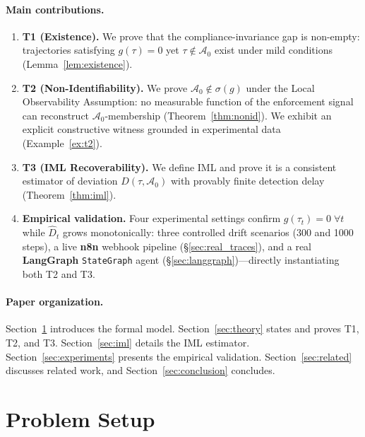 \documentclass[11pt]{article}
\newcommand{\Azero}{\mathcal{A}_0}
\newcommand{\Dhat}{\widehat{D}}
\newcommand{\sigg}{\sigma(g)}
\begin{document}
\paragraph{Main contributions.}
\begin{enumerate}[leftmargin=1.5em, itemsep=1pt]
  \item \textbf{T1 (Existence).}  We prove that the compliance-invariance
        gap is non-empty: trajectories satisfying $g(\tau)=0$ yet
        $\tau \notin \Azero$ exist under mild conditions
        (Lemma~\ref{lem:existence}).

  \item \textbf{T2 (Non-Identifiability).}  We prove $\Azero \notin \sigg$
        under the Local Observability Assumption: no measurable function of
        the enforcement signal can reconstruct $\Azero$-membership
        (Theorem~\ref{thm:nonid}).  We exhibit an explicit constructive
        witness grounded in experimental data (Example~\ref{ex:t2}).

  \item \textbf{T3 (IML Recoverability).}  We define IML and prove it is a
        consistent estimator of deviation $D(\tau,\Azero)$ with provably
        finite detection delay (Theorem~\ref{thm:iml}).

  \item \textbf{Empirical validation.}  Four experimental settings confirm
        $g(\tau_t)=0\;\forall t$ while $\Dhat_t$ grows monotonically:
        three controlled drift scenarios (300 and 1000 steps), a live
        \textbf{n8n} webhook pipeline (\S\ref{sec:real_traces}), and a
        real \textbf{LangGraph} \texttt{StateGraph} agent
        (\S\ref{sec:langgraph})---directly instantiating both T2 and T3.
\end{enumerate}

\paragraph{Paper organization.}
Section~\ref{sec:setup} introduces the formal model.
Section~\ref{sec:theory} states and proves T1, T2, and T3.
Section~\ref{sec:iml} details the IML estimator.
Section~\ref{sec:experiments} presents the empirical validation.
Section~\ref{sec:related} discusses related work, and
Section~\ref{sec:conclusion} concludes.

\section{Problem Setup}
\label{sec:setup}
\end{document}
